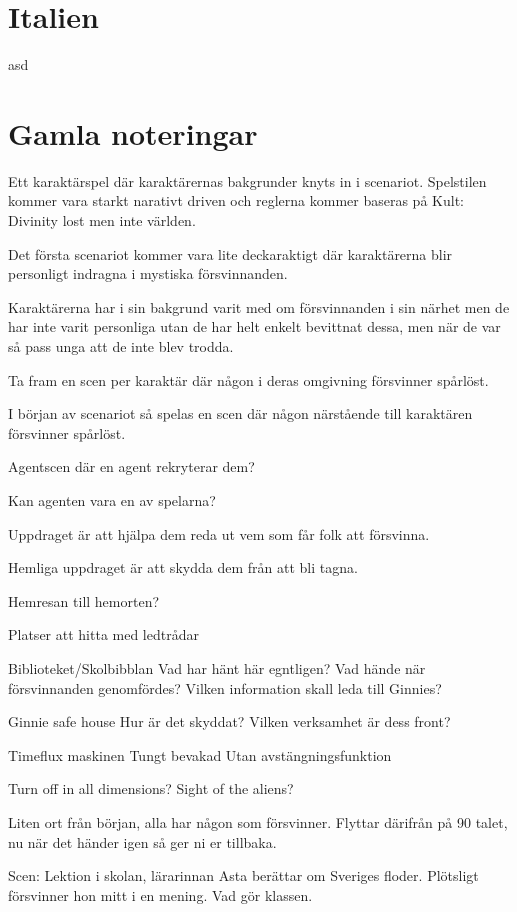 \section{Italien}
asd
\clearpage
\section{Gamla noteringar}

Ett karaktärspel där karaktärernas bakgrunder knyts in i scenariot. Spelstilen kommer vara starkt narativt driven och reglerna kommer baseras på Kult: Divinity lost men inte världen.

Det första scenariot kommer vara lite deckaraktigt där karaktärerna blir personligt indragna i mystiska försvinnanden.

Karaktärerna har i sin bakgrund varit med om försvinnanden i sin närhet men de har inte varit personliga utan de har helt enkelt bevittnat dessa, men när de var så pass unga att de inte blev trodda.

Ta fram en scen per karaktär där någon i deras omgivning försvinner spårlöst.

I början av scenariot så spelas en scen där någon närstående till karaktären försvinner spårlöst.



Agentscen där en agent rekryterar dem?

Kan agenten vara en av spelarna?

Uppdraget är att hjälpa dem reda ut vem som får folk att försvinna.

Hemliga uppdraget är att skydda dem från att bli tagna.

Hemresan till hemorten?

Platser att hitta med ledtrådar

Biblioteket/Skolbibblan
  Vad har hänt här egntligen? Vad hände när försvinnanden genomfördes? Vilken information skall leda till Ginnies?

Ginnie safe house
  Hur är det skyddat? Vilken verksamhet är dess front?

Timeflux maskinen
  Tungt bevakad
  Utan avstängningsfunktion

Turn off in all dimensions?
  Sight of the aliens?

Liten ort från början, alla har någon som försvinner. Flyttar därifrån på 90 talet, nu när det händer igen så ger ni er tillbaka.

Scen: Lektion i skolan, lärarinnan Asta berättar om Sveriges floder. Plötsligt försvinner hon mitt i en mening. Vad gör klassen.



